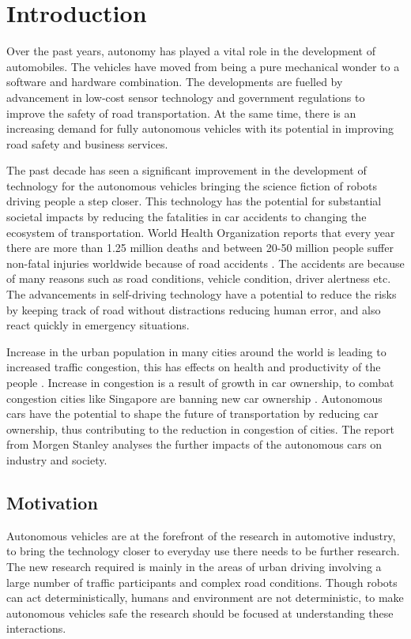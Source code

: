 \chapter{Introduction}
\label{introduction}

Over the past years, autonomy has played a vital role in the development of automobiles. The vehicles have moved from being a pure mechanical wonder to a software and hardware combination. The developments are fuelled by advancement in low-cost sensor technology and government regulations to improve the safety of road transportation. At the same time, there is an increasing demand for fully autonomous vehicles with its potential in improving road safety and business services.

The past decade has seen a significant improvement in the development of technology for the autonomous vehicles bringing the science fiction of robots driving people a step closer. This technology has the potential for substantial societal impacts by reducing the fatalities in car accidents to changing the ecosystem of transportation. World Health Organization reports that every year there are more than 1.25 million deaths and between 20-50 million people suffer non-fatal injuries worldwide because of road accidents \cite{whoaccidents}. The accidents are because of many reasons such as road conditions, vehicle condition, driver alertness etc. The advancements in self-driving technology have a potential to reduce the risks by keeping track of road without distractions reducing human error, and also react quickly in emergency situations.

Increase in the urban population in many cities around the world is leading to increased traffic congestion, this has effects on health and productivity of the people \cite{citycongestion}. Increase in congestion is a result of growth in car ownership, to combat congestion cities like Singapore are banning new car ownership \cite{singaporebanscars}. Autonomous cars have the potential to shape the future of transportation by reducing car ownership, thus contributing to the reduction in congestion of cities. The report \cite{morgenstanleyreport} from Morgen Stanley analyses the further impacts of the autonomous cars on industry and society. 


\section{Motivation}

Autonomous vehicles are at the forefront of the research in automotive industry, to bring the technology closer to everyday use there needs to be further research. The new research required is mainly in the areas of urban driving involving a large number of traffic participants and complex road conditions. Though robots can act deterministically, humans and environment are not deterministic, to make autonomous vehicles safe the research should be focused at understanding these interactions.

